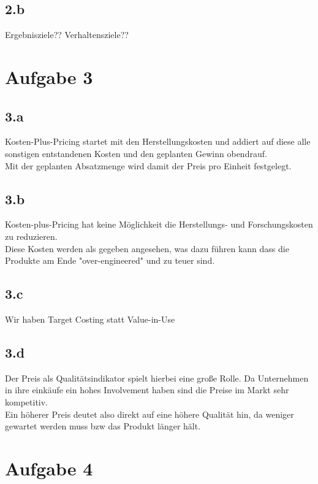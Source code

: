 \subsection*{2.b}
    Ergebnisziele?? Verhaltensziele??


\section*{Aufgabe 3}
\subsection*{3.a}
    Kosten-Plus-Pricing startet mit den Herstellungskosten und addiert auf diese alle sonstigen entstandenen Kosten und den geplanten Gewinn obendrauf. \\
    Mit der geplanten Absatzmenge wird damit der Preis pro Einheit festgelegt.

\subsection*{3.b}
    Kosten-plus-Pricing hat keine Möglichkeit die Herstellungs- und Forschungskosten zu reduzieren. \\
    Diese Kosten werden als gegeben angesehen, was dazu führen kann dass die Produkte am Ende "over-engineered" und zu teuer sind.

\subsection*{3.c}
    Wir haben Target Costing statt Value-in-Use

\subsection*{3.d}
    Der Preis als Qualitätsindikator spielt hierbei eine große Rolle. Da Unternehmen in ihre einkäufe ein hohes Involvement haben sind die Preise im Markt sehr kompetitiv. \\
    Ein höherer Preis deutet also direkt auf eine höhere Qualität hin, da weniger gewartet werden muss bzw das Produkt länger hält.


\section*{Aufgabe 4}
